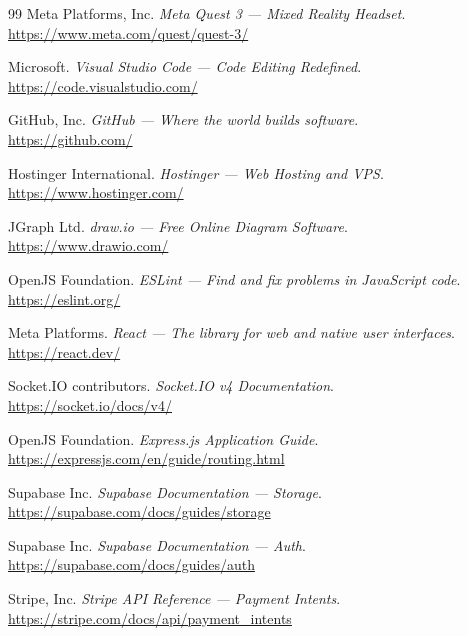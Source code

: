 \documentclass[12pt, a4paper, oneside]{report}
\begin{document}
\begin{thebibliography}{99}
Meta Platforms, Inc. \textit{Meta Quest 3 --- Mixed Reality Headset}.\\
\url{https://www.meta.com/quest/quest-3/} 

Microsoft. \textit{Visual Studio Code --- Code Editing Redefined}.\\
\url{https://code.visualstudio.com/} 

GitHub, Inc. \textit{GitHub --- Where the world builds software}.\\
\url{https://github.com/} 

Hostinger International. \textit{Hostinger --- Web Hosting and VPS}.\\
\url{https://www.hostinger.com/} 

JGraph Ltd. \textit{draw.io --- Free Online Diagram Software}.\\
\url{https://www.drawio.com/} 

OpenJS Foundation. \textit{ESLint --- Find and fix problems in JavaScript code}.\\
\url{https://eslint.org/} 

Meta Platforms. \textit{React --- The library for web and native user interfaces}.\\
\url{https://react.dev/} 

Socket.IO contributors. \textit{Socket.IO v4 Documentation}.\\
\url{https://socket.io/docs/v4/} 

OpenJS Foundation. \textit{Express.js Application Guide}.\\
\url{https://expressjs.com/en/guide/routing.html} 

Supabase Inc. \textit{Supabase Documentation --- Storage}.\\
\url{https://supabase.com/docs/guides/storage} 

Supabase Inc. \textit{Supabase Documentation --- Auth}.\\
\url{https://supabase.com/docs/guides/auth} 

Stripe, Inc. \textit{Stripe API Reference --- Payment Intents}.\\
\url{https://stripe.com/docs/api/payment_intents} 


\end{thebibliography}
\end{document}
